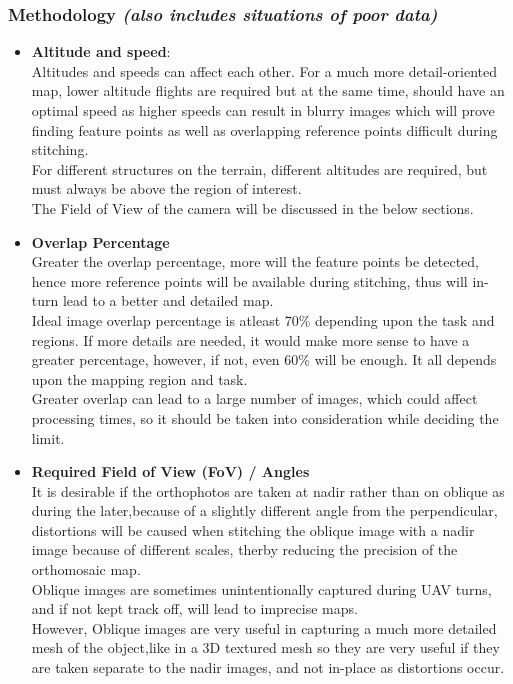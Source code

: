 \documentclass[11pt,twocolumn,letterpaper]{article}
\begin{document}
\subsubsection{Methodology \emph{(also includes situations of poor data)}}
\begin{itemize}
    \item \textbf{Altitude and speed}:
        \\ Altitudes and speeds can affect each other. For a much more detail-oriented map, lower altitude flights are required but at the same time, should have an optimal speed as higher speeds can result in blurry images which will prove finding feature points as well as overlapping reference points difficult during stitching.
        \\ For different structures on the terrain, different altitudes are required, but must always be above the region of interest.
        \\ The Field of View of the camera will be discussed in the below sections.

    \item \textbf{Overlap Percentage}
        \\ Greater the overlap percentage, more will the feature points be detected, hence more reference points will be available during stitching, thus will in-turn lead to a better and detailed map.
        \\ Ideal image overlap percentage is atleast 70\% depending upon the task and regions. If more details are needed, it would make more sense to have a greater percentage, however, if not, even 60\% will be enough. It all depends upon the mapping region and task.
        \\ Greater overlap can lead to a large number of images, which could affect processing times, so it should be taken into consideration while deciding the limit.

        
    \item \textbf{Required Field of View (FoV) / Angles}
        \\ It is desirable if the orthophotos are taken at nadir rather than on oblique as during the later,because of a slightly different angle from the perpendicular, distortions will be caused when stitching the oblique image with a nadir image because of different scales, therby reducing the precision of the orthomosaic map.
        \\ Oblique images are sometimes unintentionally captured during UAV turns, and if not kept track off, will lead to imprecise maps. 
        \\ However, Oblique images are very useful in capturing a much more detailed mesh of the object,like in a 3D textured mesh so they are very useful if they are taken separate to the nadir images, and not in-place as distortions occur.


\end{itemize}
\end{document}
